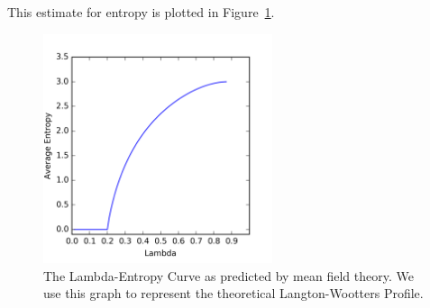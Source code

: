\documentclass[a4paper,11pt]{article}
\begin{document}
\noindent This estimate for entropy is plotted in Figure~\ref{fig:mft_lambda}.

\begin{figure}[htp]
\centering
\includegraphics[width=0.6\textwidth]{app_figs/mft_lambda}
\caption[Mean Field Theory Lambda-Entropy Curve]{
	The Lambda-Entropy Curve as predicted by mean field theory. We use this graph to represent the theoretical Langton-Wootters Profile.
}
\label{fig:mft_lambda}
\end{figure}

\processdelayedfloats

\newpage



\end{document}

